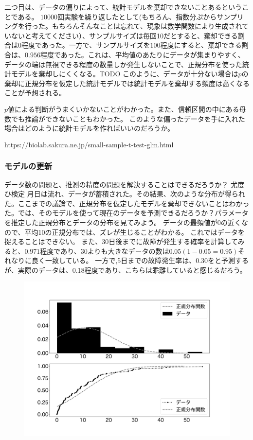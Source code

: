 二つ目は、データの偏りによって、統計モデルを棄却できないことあるということである。
$10000$回実験を繰り返したとして(もちろん、指数分ぷからサンプリングを行った。もちろんそんなことは忘れて、現象は数学関数により生成されていないと考えてください）、サンプルサイズは毎回10だとすると、棄却できる割合は0程度であった。一方で、サンプルサイズを$100$程度にすると、棄却できる割合は、$0.956$程度であった。これは、平均値のあたりにデータが集まりやすく、データの端は無視できる程度の数量しか発生しないことで、正規分布を使った統計モデルを棄却しにくくなる。TODO
このように、データが十分ない場合は$p$の棄却に正規分布を仮定した統計モデルでは統計モデルを棄却する頻度は高くなることが予想される。

$p$値による判断がうまくいかないことがわかった。また、信頼区間の中にある母数でも推論ができないこともわかった。
このような偏ったデータを手に入れた場合はどのように統計モデルを作ればいいのだろうか。
\fi

https://biolab.sakura.ne.jp/small-sample-t-test-glm.html



\subsubsection{モデルの更新}
データ数の問題と、推測の精度の問題を解決することはできるだろうか？
尤度ひ検定
\fi
月日は流れ、データが蓄積された。その結果、次のような分布が得られた。ここまでの議論で、正規分布を仮定したモデルを棄却できないことはわかった。では、そのモデルを使って現在のデータを予測できるだろうか？パラメータを推定した正規分布とデータの分布を見てみよう。
データの最頻値が0の近くなので、平均10の正規分布では、ズレが生じることがわかる。
これではデータを捉えることはできない。
また、$30$日後までに故障が発生する確率を計算してみると、$0.971$程度であり、30よりも大きなデータの数は$0.05(1-0.05=0.95)$それなりに良く一致している。
一方で,5日までの故障発生率は、$0.30$をと予測するが、実際のデータは、0.18程度であり、こちらは乖離していると感じるだろう。
\begin{figure}
\begin{center}
    \includegraphics[width=15cm]{./image/06_/normal_exponential.pdf}
\end{center}
\end{figure}



